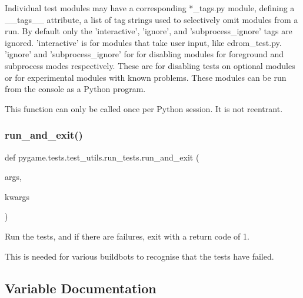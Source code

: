 \begin{DoxyVerb}
Individual test modules may have a corresponding *_tags.py module,
defining a __tags__ attribute, a list of tag strings used to selectively
omit modules from a run. By default only the 'interactive', 'ignore', and
'subprocess_ignore' tags are ignored. 'interactive' is for modules that
take user input, like cdrom_test.py. 'ignore' and 'subprocess_ignore' for
for disabling modules for foreground and subprocess modes respectively.
These are for disabling tests on optional modules or for experimental
modules with known problems. These modules can be run from the console as
a Python program.

This function can only be called once per Python session. It is not
reentrant.\end{DoxyVerb}
 \mbox{\label{namespacepygame_1_1tests_1_1test__utils_1_1run__tests_a0980c4b32a67289915e83ef70b7e71ae}} 
\subsubsection{\texorpdfstring{run\+\_\+and\+\_\+exit()}{run\_and\_exit()}}
{\footnotesize\ttfamily def pygame.\+tests.\+test\+\_\+utils.\+run\+\_\+tests.\+run\+\_\+and\+\_\+exit (\begin{DoxyParamCaption}\item[{}]{args,  }\item[{}]{kwargs }\end{DoxyParamCaption})}

\begin{DoxyVerb}Run the tests, and if there are failures, exit with a return code of 1.

This is needed for various buildbots to recognise that the tests have
failed.
\end{DoxyVerb}
 

\subsection{Variable Documentation}
\mbox{\label{namespacepygame_1_1tests_1_1test__utils_1_1run__tests_a81161e08464695fe2e6c042dda62f430}} 
